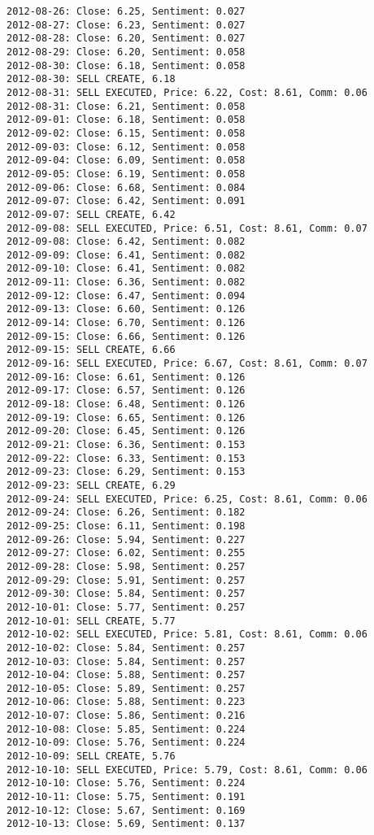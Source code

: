 \documentclass[11pt]{article}
\begin{document}
\begin{Verbatim}[commandchars=\\\{\}]
2012-08-26: Close: 6.25, Sentiment: 0.027
2012-08-27: Close: 6.23, Sentiment: 0.027
2012-08-28: Close: 6.20, Sentiment: 0.027
2012-08-29: Close: 6.20, Sentiment: 0.058
2012-08-30: Close: 6.18, Sentiment: 0.058
2012-08-30: SELL CREATE, 6.18
2012-08-31: SELL EXECUTED, Price: 6.22, Cost: 8.61, Comm: 0.06
2012-08-31: Close: 6.21, Sentiment: 0.058
2012-09-01: Close: 6.18, Sentiment: 0.058
2012-09-02: Close: 6.15, Sentiment: 0.058
2012-09-03: Close: 6.12, Sentiment: 0.058
2012-09-04: Close: 6.09, Sentiment: 0.058
2012-09-05: Close: 6.19, Sentiment: 0.058
2012-09-06: Close: 6.68, Sentiment: 0.084
2012-09-07: Close: 6.42, Sentiment: 0.091
2012-09-07: SELL CREATE, 6.42
2012-09-08: SELL EXECUTED, Price: 6.51, Cost: 8.61, Comm: 0.07
2012-09-08: Close: 6.42, Sentiment: 0.082
2012-09-09: Close: 6.41, Sentiment: 0.082
2012-09-10: Close: 6.41, Sentiment: 0.082
2012-09-11: Close: 6.36, Sentiment: 0.082
2012-09-12: Close: 6.47, Sentiment: 0.094
2012-09-13: Close: 6.60, Sentiment: 0.126
2012-09-14: Close: 6.70, Sentiment: 0.126
2012-09-15: Close: 6.66, Sentiment: 0.126
2012-09-15: SELL CREATE, 6.66
2012-09-16: SELL EXECUTED, Price: 6.67, Cost: 8.61, Comm: 0.07
2012-09-16: Close: 6.61, Sentiment: 0.126
2012-09-17: Close: 6.57, Sentiment: 0.126
2012-09-18: Close: 6.48, Sentiment: 0.126
2012-09-19: Close: 6.65, Sentiment: 0.126
2012-09-20: Close: 6.45, Sentiment: 0.126
2012-09-21: Close: 6.36, Sentiment: 0.153
2012-09-22: Close: 6.33, Sentiment: 0.153
2012-09-23: Close: 6.29, Sentiment: 0.153
2012-09-23: SELL CREATE, 6.29
2012-09-24: SELL EXECUTED, Price: 6.25, Cost: 8.61, Comm: 0.06
2012-09-24: Close: 6.26, Sentiment: 0.182
2012-09-25: Close: 6.11, Sentiment: 0.198
2012-09-26: Close: 5.94, Sentiment: 0.227
2012-09-27: Close: 6.02, Sentiment: 0.255
2012-09-28: Close: 5.98, Sentiment: 0.257
2012-09-29: Close: 5.91, Sentiment: 0.257
2012-09-30: Close: 5.84, Sentiment: 0.257
2012-10-01: Close: 5.77, Sentiment: 0.257
2012-10-01: SELL CREATE, 5.77
2012-10-02: SELL EXECUTED, Price: 5.81, Cost: 8.61, Comm: 0.06
2012-10-02: Close: 5.84, Sentiment: 0.257
2012-10-03: Close: 5.84, Sentiment: 0.257
2012-10-04: Close: 5.88, Sentiment: 0.257
2012-10-05: Close: 5.89, Sentiment: 0.257
2012-10-06: Close: 5.88, Sentiment: 0.223
2012-10-07: Close: 5.86, Sentiment: 0.216
2012-10-08: Close: 5.85, Sentiment: 0.224
2012-10-09: Close: 5.76, Sentiment: 0.224
2012-10-09: SELL CREATE, 5.76
2012-10-10: SELL EXECUTED, Price: 5.79, Cost: 8.61, Comm: 0.06
2012-10-10: Close: 5.76, Sentiment: 0.224
2012-10-11: Close: 5.75, Sentiment: 0.191
2012-10-12: Close: 5.67, Sentiment: 0.169
2012-10-13: Close: 5.69, Sentiment: 0.137

\end{Verbatim}
\end{document}
